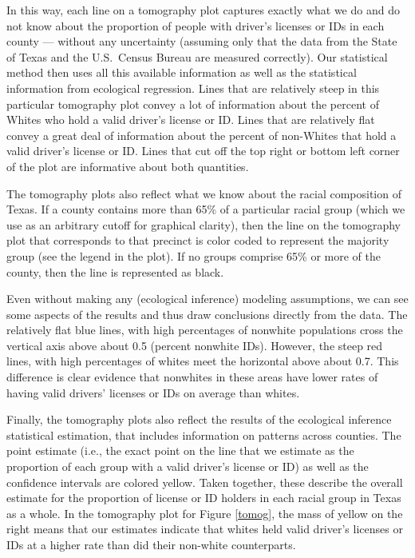 \documentclass[12pt]{article}
\begin{document}
In this way, each line on a tomography plot captures exactly what we
do and do not know about the proportion of people with driver's
licenses or IDs in each county --- without any uncertainty (assuming
only that the data from the State of Texas and the U.S.\ Census Bureau
are measured correctly). Our statistical method then uses all this
available information as well as the statistical information from
ecological regression. Lines that are relatively steep in this
particular tomography plot convey a lot of information about the
percent of Whites who hold a valid driver's license or ID.  Lines that
are relatively flat convey a great deal of information about the
percent of non-Whites that hold a valid driver's license or ID.  Lines
that cut off the top right or bottom left corner of the plot are
informative about both quantities.

The tomography plots also reflect what we know about the racial composition
of Texas. If a county contains more than 65\% of a
particular racial group (which we use as an arbitrary cutoff for
graphical clarity), then the line on the tomography plot that
corresponds to that precinct is color coded to represent the majority
group (see the legend in the plot). If no groups comprise 65\% or more
of the county, then the line is represented as black.

Even without making any (ecological inference) modeling assumptions,
we can see some aspects of the results and thus draw conclusions
directly from the data.  The relatively flat blue lines, with high
percentages of nonwhite populations cross the vertical axis above
about 0.5 (percent nonwhite IDs).  However, the steep red lines, with
high percentages of whites meet the horizontal above about 0.7.  This
difference is clear evidence that nonwhites in these areas have lower
rates of having valid drivers' licenses or IDs on average than
whites.

Finally, the tomography plots also reflect the results of the
ecological inference statistical estimation, that includes information
on patterns across counties. The point estimate (i.e., the exact point
on the line that we estimate as the proportion of each group with a
valid driver's license or ID) as well as the confidence intervals are
colored yellow.  Taken together, these describe the overall estimate
for the proportion of license or ID holders in each racial group in Texas as
a whole. In the tomography plot for Figure \ref{tomog}, the mass of
yellow on the right means that our estimates indicate that whites held
valid driver's licenses or IDs at a higher rate than did their non-white
counterparts.
\end{document}
